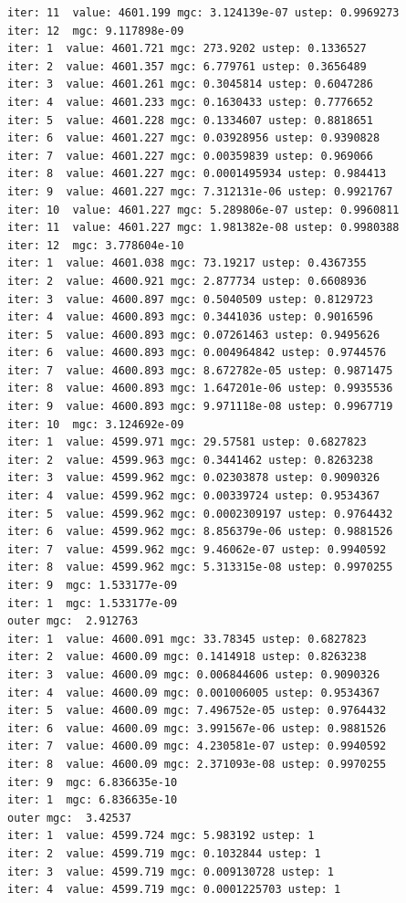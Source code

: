 \documentclass[
  letterpaper,
  DIV=11,
  numbers=noendperiod]{scrartcl}
\begin{document}
\begin{verbatim}
iter: 11  value: 4601.199 mgc: 3.124139e-07 ustep: 0.9969273 
iter: 12  mgc: 9.117898e-09 
iter: 1  value: 4601.721 mgc: 273.9202 ustep: 0.1336527 
iter: 2  value: 4601.357 mgc: 6.779761 ustep: 0.3656489 
iter: 3  value: 4601.261 mgc: 0.3045814 ustep: 0.6047286 
iter: 4  value: 4601.233 mgc: 0.1630433 ustep: 0.7776652 
iter: 5  value: 4601.228 mgc: 0.1334607 ustep: 0.8818651 
iter: 6  value: 4601.227 mgc: 0.03928956 ustep: 0.9390828 
iter: 7  value: 4601.227 mgc: 0.00359839 ustep: 0.969066 
iter: 8  value: 4601.227 mgc: 0.0001495934 ustep: 0.984413 
iter: 9  value: 4601.227 mgc: 7.312131e-06 ustep: 0.9921767 
iter: 10  value: 4601.227 mgc: 5.289806e-07 ustep: 0.9960811 
iter: 11  value: 4601.227 mgc: 1.981382e-08 ustep: 0.9980388 
iter: 12  mgc: 3.778604e-10 
iter: 1  value: 4601.038 mgc: 73.19217 ustep: 0.4367355 
iter: 2  value: 4600.921 mgc: 2.877734 ustep: 0.6608936 
iter: 3  value: 4600.897 mgc: 0.5040509 ustep: 0.8129723 
iter: 4  value: 4600.893 mgc: 0.3441036 ustep: 0.9016596 
iter: 5  value: 4600.893 mgc: 0.07261463 ustep: 0.9495626 
iter: 6  value: 4600.893 mgc: 0.004964842 ustep: 0.9744576 
iter: 7  value: 4600.893 mgc: 8.672782e-05 ustep: 0.9871475 
iter: 8  value: 4600.893 mgc: 1.647201e-06 ustep: 0.9935536 
iter: 9  value: 4600.893 mgc: 9.971118e-08 ustep: 0.9967719 
iter: 10  mgc: 3.124692e-09 
iter: 1  value: 4599.971 mgc: 29.57581 ustep: 0.6827823 
iter: 2  value: 4599.963 mgc: 0.3441462 ustep: 0.8263238 
iter: 3  value: 4599.962 mgc: 0.02303878 ustep: 0.9090326 
iter: 4  value: 4599.962 mgc: 0.00339724 ustep: 0.9534367 
iter: 5  value: 4599.962 mgc: 0.0002309197 ustep: 0.9764432 
iter: 6  value: 4599.962 mgc: 8.856379e-06 ustep: 0.9881526 
iter: 7  value: 4599.962 mgc: 9.46062e-07 ustep: 0.9940592 
iter: 8  value: 4599.962 mgc: 5.313315e-08 ustep: 0.9970255 
iter: 9  mgc: 1.533177e-09 
iter: 1  mgc: 1.533177e-09 
outer mgc:  2.912763 
iter: 1  value: 4600.091 mgc: 33.78345 ustep: 0.6827823 
iter: 2  value: 4600.09 mgc: 0.1414918 ustep: 0.8263238 
iter: 3  value: 4600.09 mgc: 0.006844606 ustep: 0.9090326 
iter: 4  value: 4600.09 mgc: 0.001006005 ustep: 0.9534367 
iter: 5  value: 4600.09 mgc: 7.496752e-05 ustep: 0.9764432 
iter: 6  value: 4600.09 mgc: 3.991567e-06 ustep: 0.9881526 
iter: 7  value: 4600.09 mgc: 4.230581e-07 ustep: 0.9940592 
iter: 8  value: 4600.09 mgc: 2.371093e-08 ustep: 0.9970255 
iter: 9  mgc: 6.836635e-10 
iter: 1  mgc: 6.836635e-10 
outer mgc:  3.42537 
iter: 1  value: 4599.724 mgc: 5.983192 ustep: 1 
iter: 2  value: 4599.719 mgc: 0.1032844 ustep: 1 
iter: 3  value: 4599.719 mgc: 0.009130728 ustep: 1 
iter: 4  value: 4599.719 mgc: 0.0001225703 ustep: 1 

\end{verbatim}
\end{document}
